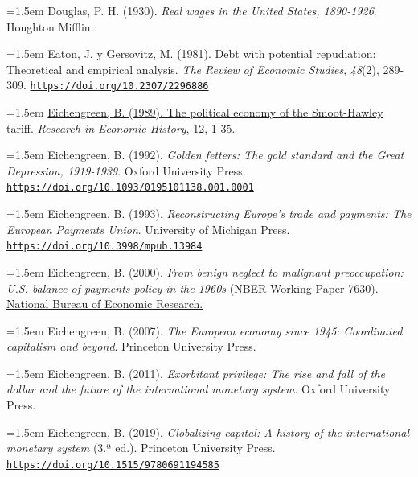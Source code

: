 \documentclass[10pt,a4paper]{article}
\begin{document}
\noindent\hangindent=1.5em Douglas, P. H. (1930). \textit{Real wages in the United States, 1890-1926}. Houghton Mifflin.

{\sloppy\noindent\hangindent=1.5em Eaton, J. y Gersovitz, M. (1981). Debt with potential repudiation: Theoretical and empirical analysis. \textit{The Review of Economic Studies}, \textit{48}(2), 289-309. \href{https://doi.org/10.2307/2296886}{\nolinkurl{https://doi.org/10.2307/2296886}}\par}

{\sloppy\noindent\hangindent=1.5em \href{https://www.nber.org/papers/w2001}{Eichengreen, B. (1989). The political economy of the Smoot-Hawley tariff. \textit{Research in Economic History}, 12, 1-35.}\par}

{\sloppy\noindent\hangindent=1.5em Eichengreen, B. (1992). \textit{Golden fetters: The gold standard and the Great Depression, 1919-1939}. Oxford University Press. \href{https://doi.org/10.1093/0195101138.001.0001}{\nolinkurl{https://doi.org/10.1093/0195101138.001.0001}}\par}

{\sloppy\noindent\hangindent=1.5em Eichengreen, B. (1993). \textit{Reconstructing Europe's trade and payments: The European Payments Union}. University of Michigan Press. \href{https://doi.org/10.3998/mpub.13984}{\nolinkurl{https://doi.org/10.3998/mpub.13984}}\par}

{\sloppy\noindent\hangindent=1.5em \href{https://ideas.repec.org/p/nbr/nberwo/7630.html}{Eichengreen, B. (2000). \textit{From benign neglect to malignant preoccupation: U.S. balance-of-payments policy in the 1960s} (NBER Working Paper 7630). National Bureau of Economic Research.}\par}

{\sloppy\noindent\hangindent=1.5em Eichengreen, B. (2007). \textit{The European economy since 1945: Coordinated capitalism and beyond}. Princeton University Press.\par}

{\sloppy\noindent\hangindent=1.5em Eichengreen, B. (2011). \textit{Exorbitant privilege: The rise and fall of the dollar and the future of the international monetary system}. Oxford University Press.\par}

{\sloppy\noindent\hangindent=1.5em Eichengreen, B. (2019). \textit{Globalizing capital: A history of the international monetary system} (3.ª ed.). Princeton University Press. \href{https://doi.org/10.1515/9780691194585}{\nolinkurl{https://doi.org/10.1515/9780691194585}}\par}
\end{document}
